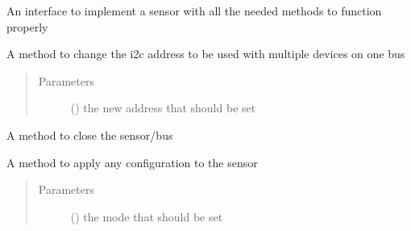 \documentclass[letterpaper,10pt,english]{sphinxmanual}
\begin{document}
\begin{fulllineitems}
\label{\detokenize{sensor:lib.sensor.SensorInterface}}
An interface to implement a sensor with all the needed methods to function properly

\begin{fulllineitems}
\label{\detokenize{sensor:lib.sensor.SensorInterface.change_addr}}
A method to change the i2c address to be used with multiple devices on one bus
\begin{quote}\begin{description}
\item[{Parameters}] \leavevmode
{} () \textendash{} the new address that should be set

\end{description}\end{quote}

\end{fulllineitems}


\begin{fulllineitems}
\label{\detokenize{sensor:lib.sensor.SensorInterface.close}}
A method to close the sensor/bus

\end{fulllineitems}


\begin{fulllineitems}
\label{\detokenize{sensor:lib.sensor.SensorInterface.configure}}
A method to apply any configuration to the sensor
\begin{quote}\begin{description}
\item[{Parameters}] \leavevmode
{} () \textendash{} the mode that should be set


\end{description}
\end{quote}
\end{fulllineitems}
\end{fulllineitems}
\end{document}
